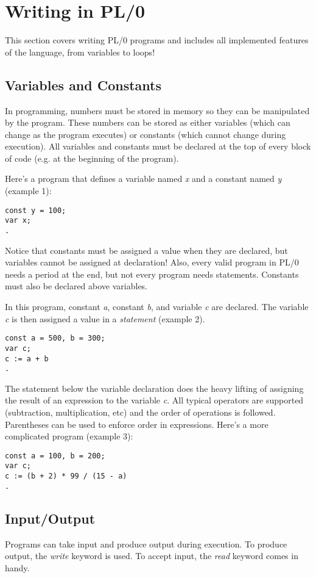 \documentclass[12pt]{memoir}
\begin{document}
\pagebreak

\section*{Writing in PL/0}
This section covers writing PL/0 programs and includes all implemented features of
the language, from variables to loops!

\subsection*{Variables and Constants}
In programming, numbers must be stored in memory so they can be manipulated by the program.
These numbers can be stored as either variables (which can change as the program executes)
or constants (which cannot change during execution). All variables and constants must be
declared at the top of every block of code (e.g. at the beginning of the program).

Here's a program that defines a variable named \emph{x} and a constant named \emph{y}
(example 1):
\begin{lstlisting}
const y = 100;
var x;
.
\end{lstlisting}
Notice that constants must be assigned a value when they are declared, but variables cannot
be assigned at declaration! Also, every valid program in PL/0 needs a period at the end, but
not every program needs statements. Constants must also be declared above variables.

In this program, constant \emph{a}, constant \emph{b}, and variable \emph{c} are declared.
The variable \emph{c} is then assigned a value in a \emph{statement} (example 2).
\begin{lstlisting}
const a = 500, b = 300;
var c;
c := a + b
.
\end{lstlisting}
The statement below the variable declaration does the heavy lifting of assigning the
result of an expression to the variable \emph{c}. All typical operators are supported
(subtraction, multiplication, etc) and the order of operations is followed. Parentheses
can be used to enforce order in expressions. Here's a more complicated program (example 3):
\begin{lstlisting}
const a = 100, b = 200;
var c;
c := (b + 2) * 99 / (15 - a)
.
\end{lstlisting}

\subsection*{Input/Output}
Programs can take input and produce output during execution. To produce output, the
\emph{write} keyword is used. To accept input, the \emph{read} keyword comes in handy.
\end{document}
